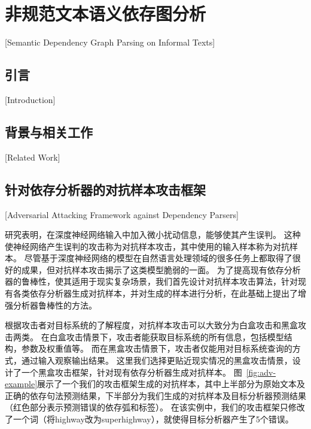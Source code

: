 
\chapter[非规范文本语义依存图分析]{非规范文本语义依存图分析}[Semantic Dependency Graph Parsing on Informal Texts]

\section{引言}[Introduction]

\section{背景与相关工作}[Related Work]

\section{针对依存分析器的对抗样本攻击框架}[Adversarial Attacking Framework against Dependency Parsers]

研究表明，在深度神经网络输入中加入微小扰动信息，能够使其产生误判。
这种使神经网络产生误判的攻击称为对抗样本攻击，其中使用的输入样本称为对抗样本。
尽管基于深度神经网络的模型在自然语言处理领域的很多任务上都取得了很好的成果，但对抗样本攻击揭示了这类模型脆弱的一面。
为了提高现有依存分析器的鲁棒性，使其适用于现实复杂场景，我们首先设计对抗样本攻击算法，针对现有各类依存分析器生成对抗样本，并对生成的样本进行分析，在此基础上提出了增强分析器鲁棒性的方法。

根据攻击者对目标系统的了解程度，对抗样本攻击可以大致分为白盒攻击和黑盒攻击两类。
在白盒攻击情景下，攻击者能获取目标系统的所有信息，包括模型结构，参数及权重值等。
而在黑盒攻击情景下，攻击者仅能用对目标系统查询的方式，通过输入观察输出结果。
这里我们选择更贴近现实情况的黑盒攻击情景，设计了一个黑盒攻击框架，针对现有依存分析器生成对抗样本。
图~\ref{fig:adv-example}展示了一个我们的攻击框架生成的对抗样本，其中上半部分为原始文本及正确的依存句法预测结果，下半部分为我们生成的对抗样本及目标分析器预测结果（红色部分表示预测错误的依存弧和标签）。
在该实例中，我们的攻击框架只修改了一个词（将highway改为superhighway），就使得目标分析器产生了5个错误。

